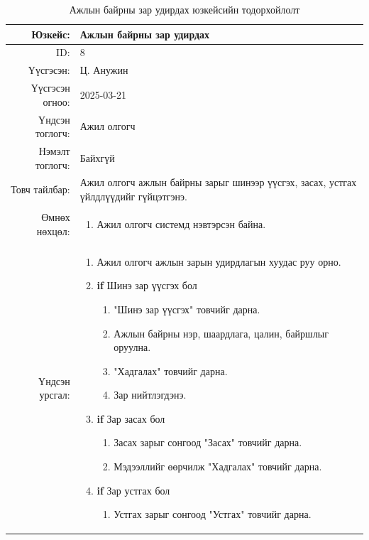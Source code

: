 \begin{longtable}{|r|p{11.5cm}|}
    \caption{Ажлын байрны зар удирдах юзкейсийн тодорхойлолт}
    \label{table:usecase8}\\ \hline
    {Юзкейс:} & {Ажлын байрны зар удирдах}\\ \hline
    {ID:} & {8}\\ \hline
    {Үүсгэсэн:} & {Ц. Анужин}\\ \hline
    {Үүсгэсэн огноо:} & {2025-03-21}\\ \hline
    {Үндсэн тоглогч:} & {Ажил олгогч}\\ \hline
    {Нэмэлт тоглогч:} & {Байхгүй}\\ \hline
    {Товч тайлбар:} & {Ажил олгогч ажлын байрны зарыг шинээр үүсгэх, засах, устгах үйлдлүүдийг гүйцэтгэнэ.}\\ \hline
    {Өмнөх нөхцөл:} & {\begin{enumerate}[nosep]
        \item Ажил олгогч системд нэвтэрсэн байна.
    \end{enumerate}}\\ \hline
    {Үндсэн урсгал:} & {\begin{enumerate}[nosep]
        \item Ажил олгогч ажлын зарын удирдлагын хуудас руу орно.
        \item \textbf{if} Шинэ зар үүсгэх бол
            \begin{enumerate}[nosep,label*=\arabic*.]
                \item "Шинэ зар үүсгэх" товчийг дарна.
                \item Ажлын байрны нэр, шаардлага, цалин, байршлыг оруулна.
                \item "Хадгалах" товчийг дарна.
                \item Зар нийтлэгдэнэ.
            \end{enumerate}
        \item \textbf{if} Зар засах бол
            \begin{enumerate}[nosep,label*=\arabic*.]
                \item Засах зарыг сонгоод "Засах" товчийг дарна.
                \item Мэдээллийг өөрчилж "Хадгалах" товчийг дарна.
            \end{enumerate}
        \item \textbf{if} Зар устгах бол
            \begin{enumerate}[nosep,label*=\arabic*.]
                \item Устгах зарыг сонгоод "Устгах" товчийг дарна.

\end{enumerate}
\end{enumerate}}
\end{longtable}

